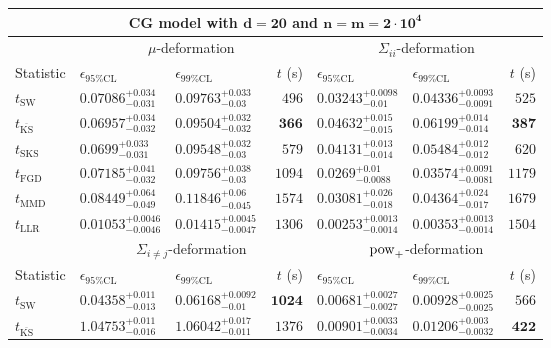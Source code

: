 \begin{tabular}{l|llr|llr}
	\toprule
	\multicolumn{7}{c}{{\bf CG model with $\mathbf{d=20}$ and $\mathbf{n=m=2\cdot 10^{4}}$}} \\
	\toprule
	\multicolumn{1}{c}{} & \multicolumn{3}{c}{$\mu$-deformation} & \multicolumn{3}{c}{$\Sigma_{ii}$-deformation} \\
	Statistic & $\epsilon_{95\%\mathrm{CL}}$ & $\epsilon_{99\%\mathrm{CL}}$ & $t$ (s) & $\epsilon_{95\%\mathrm{CL}}$ & $\epsilon_{99\%\mathrm{CL}}$ & $t$ (s) \\
	\midrule
	$t_{\mathrm{SW}}$ & $0.07086_{-0.031}^{+0.034}$ & $0.09763_{-0.03}^{+0.033}$ & $496$ & $0.03243_{-0.01}^{+0.0098}$ & $0.04336_{-0.0091}^{+0.0093}$ & $525$ \\
	$t_{\overline{\mathrm{KS}}}$ & ${\mathbf{0.06957_{-0.032}^{+0.034}}}$ & ${\mathbf{0.09504_{-0.032}^{+0.032}}}$ & ${\mathbf{366}}$ & $0.04632_{-0.015}^{+0.015}$ & $0.06199_{-0.014}^{+0.014}$ & ${\mathbf{387}}$ \\
	$t_{\mathrm{SKS}}$ & $0.0699_{-0.031}^{+0.033}$ & $0.09548_{-0.03}^{+0.032}$ & $579$ & $0.04131_{-0.014}^{+0.013}$ & $0.05484_{-0.012}^{+0.012}$ & $620$ \\
	$t_{\mathrm{FGD}}$ & $0.07185_{-0.032}^{+0.041}$ & $0.09756_{-0.03}^{+0.038}$ & $1094$ & ${\mathbf{0.0269_{-0.0088}^{+0.01}}}$ & ${\mathbf{0.03574_{-0.0081}^{+0.0091}}}$ & $1179$ \\
	$t_{\mathrm{MMD}}$ & $0.08449_{-0.049}^{+0.064}$ & $0.11846_{-0.045}^{+0.06}$ & $1574$ & $0.03081_{-0.018}^{+0.026}$ & $0.04364_{-0.017}^{+0.024}$ & $1679$ \\
	$t_{\mathrm{LLR}}$ & $0.01053_{-0.0046}^{+0.0046}$ & $0.01415_{-0.0047}^{+0.0045}$ & $1306$ & $0.00253_{-0.0014}^{+0.0013}$ & $0.00353_{-0.0014}^{+0.0013}$ & $1504$ \\
	\toprule
	\multicolumn{1}{c}{} & \multicolumn{3}{c}{$\Sigma_{i\neq j}$-deformation} & \multicolumn{3}{c}{$\rm{pow}_{+}$-deformation} \\
	Statistic & $\epsilon_{95\%\mathrm{CL}}$ & $\epsilon_{99\%\mathrm{CL}}$ & $t$ (s) & $\epsilon_{95\%\mathrm{CL}}$ & $\epsilon_{99\%\mathrm{CL}}$ & $t$ (s) \\
	\midrule
	$t_{\mathrm{SW}}$ & $0.04358_{-0.013}^{+0.011}$ & $0.06168_{-0.01}^{+0.0092}$ & ${\mathbf{1024}}$ & $0.00681_{-0.0027}^{+0.0027}$ & $0.00928_{-0.0025}^{+0.0025}$ & $566$ \\
	$t_{\overline{\mathrm{KS}}}$ & $1.04753_{-0.016}^{+0.011}$ & $1.06042_{-0.011}^{+0.017}$ & $1376$ & $0.00901_{-0.0034}^{+0.0033}$ & $0.01206_{-0.0032}^{+0.003}$ & ${\mathbf{422}}$ \\

\end{tabular}
